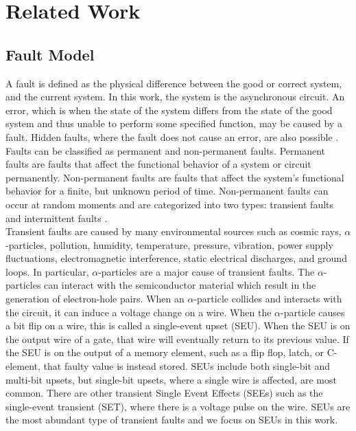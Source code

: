 \documentclass[12pt]{report}
\begin{document}
\chapter{Related Work}
\section{Fault Model}
A fault is defined as the physical difference between the good or correct system, and the current system.  In this work, the system is the asynchronous circuit.  An error, which is when the state of the system differs from the state of the good system and thus unable to perform some specified function, may be caused by a fault.  Hidden faults, where the fault does not cause an error, are also possible \cite{jha_gupta_2003}. \\

Faults can be classified as permanent and non-permanent faults. Permanent faults are faults that affect the functional behavior of a system or circuit permanently.  Non-permanent faults are faults that affect the system's functional behavior for a finite, but unknown period of time.  Non-permanent faults can occur at random moments and are categorized into two types:  transient faults and intermittent faults \cite{jha_gupta_2003}.\\ %

Transient faults are caused by many environmental sources such as cosmic rays, $\alpha$-particles, pollution, humidity, temperature, pressure, vibration, power supply fluctuations, electromagnetic interference, static electrical discharges, and ground loops. In particular, $\alpha$-particles are a major cause of transient faults.  The $\alpha$-particles can interact with the semiconductor material which result in the generation of electron-hole pairs.  When an $\alpha$-particle collides and interacts with the circuit, it can induce a voltage change on a wire.  When the $\alpha$-particle causes a bit flip on a wire, this is called a single-event upset (SEU).  When the SEU is on the output wire of a gate, that wire will eventually return to its previous value.  If the SEU is on the output of a memory element, such as a flip flop, latch, or C-element, that faulty value is instead stored.  SEUs include both single-bit and multi-bit upsets, but single-bit upsets, where a single wire is affected, are most common.  There are other transient Single Event Effects (SEEs) such as the single-event transient (SET), where there is a voltage pulse on the wire.  SEUs are the most abundant type of transient faults and we focus on SEUs in this work.  \cite{jha_gupta_2003}\\
\end{document}
